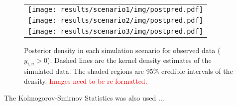 \documentclass[12pt]{article} %
\newcommand{\alert}[1]{\textcolor{red}{#1}}
\begin{document}
\begin{figure}[t!]
  \centering
  \begin{tabular}{c}
    \texttt{[image: results/scenario1/img/postpred.pdf]} \\
    \texttt{[image: results/scenario2/img/postpred.pdf]} \\
    \texttt{[image: results/scenario3/img/postpred.pdf]} \\
  \end{tabular}
  \caption{Posterior density in each simulation scenario for observed data
  ($y_{i,n}>0$). Dashed lines are the kernel density estimates of the
  simulated data. The shaded regions are 95\% credible intervals of the
  density. \alert{Images need to be re-formatted.}}
  \label{fig:sim-postdens}
\end{figure}

The Kolmogorov-Smirnov Statistics was also used ...

% 
\end{document}
